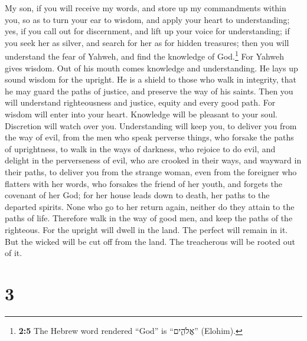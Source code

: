  My son, if you will receive my words, and store up my
commandments within you,  so as to turn your ear to
wisdom, and apply your heart to understanding;  yes, if
you call out for discernment, and lift up your voice for understanding;
 if you seek her as silver, and search for her as for
hidden treasures;  then you will understand the fear of
Yahweh, and find the knowledge of God.\footnote{\textbf{2:5} The Hebrew
  word rendered ``God'' is ``אֱלֹהִ֑ים'' (Elohim).}  For
Yahweh gives wisdom. Out of his mouth comes knowledge and understanding.
 He lays up sound wisdom for the upright. He is a shield
to those who walk in integrity,  that he may guard the
paths of justice, and preserve the way of his saints. 
Then you will understand righteousness and justice, equity and every
good path.  For wisdom will enter into your heart.
Knowledge will be pleasant to your soul.  Discretion will
watch over you. Understanding will keep you,  to deliver
you from the way of evil, from the men who speak perverse things,
 who forsake the paths of uprightness, to walk in the
ways of darkness,  who rejoice to do evil, and delight in
the perverseness of evil,  who are crooked in their ways,
and wayward in their paths,  to deliver you from the
strange woman, even from the foreigner who flatters with her words,
 who forsakes the friend of her youth, and forgets the
covenant of her God;  for her house leads down to death,
her paths to the departed spirits.  None who go to her
return again, neither do they attain to the paths of life.
 Therefore walk in the way of good men, and keep the
paths of the righteous.  For the upright will dwell in
the land. The perfect will remain in it.  But the wicked
will be cut off from the land. The treacherous will be rooted out of it.

\hypertarget{section-2}{%
\section{3}\label{section-2}}

